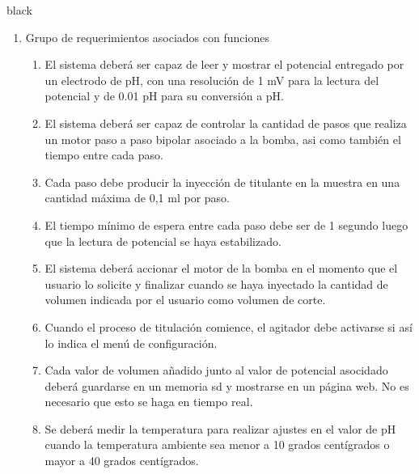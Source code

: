 \documentclass[11pt]{charter}
\begin{document}
\begin{consigna}{black}
\begin{enumerate}
\item Grupo de requerimientos asociados con funciones
	\begin{enumerate}
	\item El sistema deberá ser capaz de leer y mostrar el potencial entregado por un electrodo de pH, con una resolución de 1 mV para la lectura del potencial y de 0.01 pH para su conversión a pH.
	\item El sistema deberá ser capaz de controlar la cantidad de pasos que realiza un motor paso a paso bipolar asociado a la bomba, asi como también el tiempo entre cada paso.
	\item Cada paso debe producir la inyección de titulante en la muestra en una cantidad máxima de 0,1 ml por paso.
	\item El tiempo mínimo de espera entre cada paso debe ser de 1 segundo luego que la lectura de potencial se haya estabilizado.
	\item El sistema deberá accionar el motor de la bomba en el momento que el usuario lo solicite y finalizar cuando se haya inyectado la cantidad de volumen indicada por el usuario como volumen de corte.
	\item Cuando el proceso de titulación comience, el agitador debe activarse si así lo indica el menú de configuración.
	\item Cada valor de volumen añadido junto al valor de potencial asocidado deberá guardarse en un memoria sd y mostrarse en un página web. No es necesario que esto se haga en tiempo real.
	\item Se deberá medir la temperatura para realizar ajustes en el valor de pH cuando la temperatura ambiente sea menor a 10 grados centígrados o mayor a 40 grados centígrados.
	\end{enumerate}
	

\end{enumerate}
\end{consigna}
\end{document}
